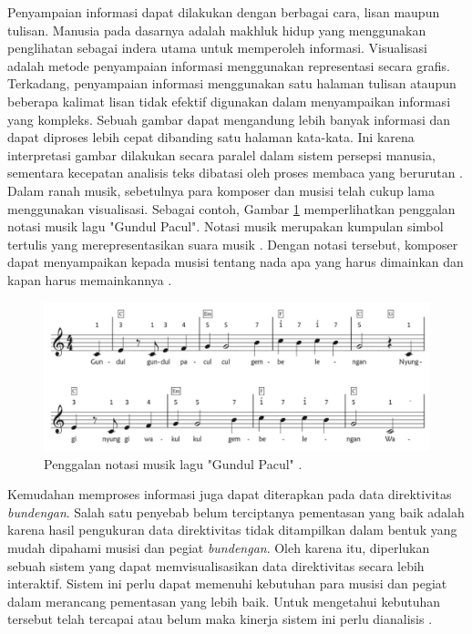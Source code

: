 Penyampaian informasi dapat dilakukan dengan berbagai cara, lisan maupun tulisan. Manusia pada dasarnya adalah makhluk hidup yang menggunakan penglihatan sebagai indera utama untuk memperoleh informasi. Visualisasi adalah metode penyampaian informasi menggunakan representasi secara grafis. Terkadang, penyampaian informasi menggunakan satu halaman tulisan ataupun beberapa kalimat lisan tidak efektif digunakan dalam menyampaikan informasi yang kompleks. Sebuah gambar dapat mengandung lebih banyak informasi dan dapat diproses lebih cepat dibanding satu halaman kata-kata. Ini karena interpretasi gambar dilakukan secara paralel dalam sistem persepsi manusia, sementara kecepatan analisis teks dibatasi oleh proses membaca yang berurutan \cite{buku_visual}. Dalam ranah musik, sebetulnya para komposer dan musisi telah cukup lama menggunakan visualisasi. Sebagai contoh, Gambar \ref{fig:gundulPacul} memperlihatkan penggalan notasi musik lagu "Gundul Pacul". Notasi musik merupakan kumpulan simbol tertulis yang merepresentasikan suara musik \cite{bukuTeoriMusik}. Dengan notasi tersebut, komposer dapat menyampaikan kepada musisi tentang nada apa yang harus dimainkan dan kapan harus memainkannya \cite{videoTedEd}. \par  
\begin{figure}[t!]
    \centering
    \includegraphics[width= 14 cm]{Gambar/gundulPacul.jpg}
    \caption{Penggalan notasi musik lagu "Gundul Pacul" \cite{bukuLaguIndo}.}
    \label{fig:gundulPacul}
\end{figure}
Kemudahan memproses informasi juga dapat diterapkan pada data direktivitas \textit{bundengan}. Salah satu penyebab belum terciptanya pementasan \bundengan yang baik adalah karena hasil pengukuran data direktivitas tidak ditampilkan dalam bentuk yang mudah dipahami musisi dan pegiat \textit{bundengan}. Oleh karena itu, diperlukan sebuah sistem yang dapat memvisualisasikan data direktivitas \bundengan secara lebih interaktif. Sistem ini perlu dapat memenuhi kebutuhan para musisi dan pegiat \bundengan dalam merancang pementasan \bundengan yang lebih baik. Untuk mengetahui kebutuhan tersebut telah tercapai atau belum maka kinerja sistem ini perlu dianalisis \cite{bukuUlrich}. \par 


